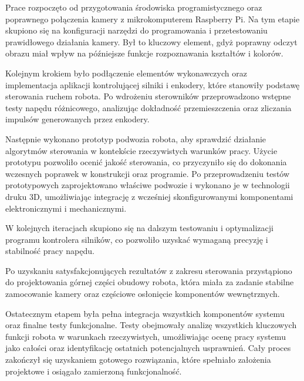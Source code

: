 Prace rozpoczęto od przygotowania środowiska programistycznego oraz poprawnego połączenia kamery z mikrokomputerem Raspberry Pi. Na tym etapie skupiono się na konfiguracji narzędzi do programowania i przetestowaniu prawidłowego działania kamery. Był to kluczowy element, gdyż poprawny odczyt obrazu miał wpływ na późniejsze funkcje rozpoznawania kształtów i kolorów.

Kolejnym krokiem było podłączenie elementów wykonawczych oraz implementacja aplikacji kontrolującej silniki i enkodery, które stanowiły podstawę sterowania ruchem robota. Po wdrożeniu sterowników przeprowadzono wstępne testy napędu różnicowego, analizując dokładność przemieszczenia oraz zliczania impulsów generowanych przez enkodery. 

Następnie wykonano prototyp podwozia robota, aby sprawdzić działanie algorytmów sterowania w kontekście rzeczywistych warunków pracy. Użycie prototypu pozwoliło ocenić jakość sterowania, co przyczyniło się do dokonania wczesnych poprawek w konstrukcji oraz programie. Po przeprowadzeniu testów prototypowych zaprojektowano właściwe podwozie i wykonano je w technologii druku 3D, umożliwiając integrację z wcześniej skonfigurowanymi komponentami elektronicznymi i mechanicznymi.

W kolejnych iteracjach skupiono się na dalszym testowaniu i optymalizacji programu kontrolera silników, co pozwoliło uzyskać wymaganą precyzję i stabilność pracy napędu. 

Po uzyskaniu satysfakcjonujących rezultatów z zakresu sterowania przystąpiono do projektowania górnej części obudowy robota, która miała za zadanie stabilne zamocowanie kamery oraz częściowe osłonięcie komponentów wewnętrznych. 

Ostatecznym etapem była pełna integracja wszystkich komponentów systemu oraz finalne testy funkcjonalne. Testy obejmowały analizę wszystkich kluczowych funkcji robota w warunkach rzeczywistych, umożliwiając ocenę pracy systemu jako całości oraz identyfikację ostatnich potencjalnych usprawnień. Cały proces zakończył się uzyskaniem gotowego rozwiązania, które spełniało założenia projektowe i osiągało zamierzoną funkcjonalność.
